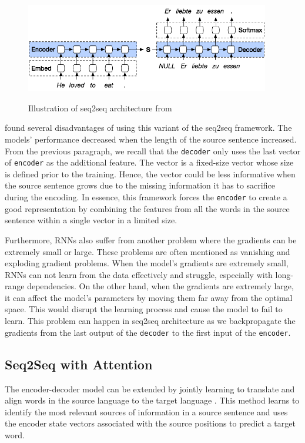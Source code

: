 \begin{figure}[h]
    {\includegraphics[width=0.95\textwidth]{img/rnnseq2seq.png}}
    \centering
    \caption{Illustration of seq2seq architecture from }
    \label{img:rnnseq2seq}
\end{figure}

 found several disadvantages of using this variant of the seq2seq framework. The models' performance decreased when the length of the source sentence increased. From the previous paragraph, we recall that the \texttt{decoder} only uses the last vector of \texttt{encoder} as the additional feature.
The vector is a fixed-size vector whose size is defined prior to the training. Hence, the vector could be less informative when the source sentence grows due to the missing information it has to sacrifice during the encoding. In essence, this framework forces the \texttt{encoder} to create a good representation by combining the features from all the words in the source sentence within a single vector in a limited size.

Furthermore, RNNs also suffer from another problem where the gradients can be extremely small or large. These problems are often mentioned as vanishing and exploding gradient problems. When the model's gradients are extremely small, RNNs can not learn from the data effectively and struggle, especially with long-range dependencies. On the other hand, when the gradients are extremely large, it can affect the model's parameters by moving them far away from the optimal space. This would disrupt the learning process and cause the model to fail to learn. This problem can happen in seq2seq architecture as we backpropagate the gradients from the last output of the \texttt{decoder} to the first input of the \texttt{encoder}.

\subsection{Seq2Seq with Attention}
The encoder-decoder model can be extended by jointly learning to translate and align words in the source language to the target language . This method learns to identify the most relevant sources of information in a source sentence and uses the encoder state vectors associated with the source positions to predict a target word.

